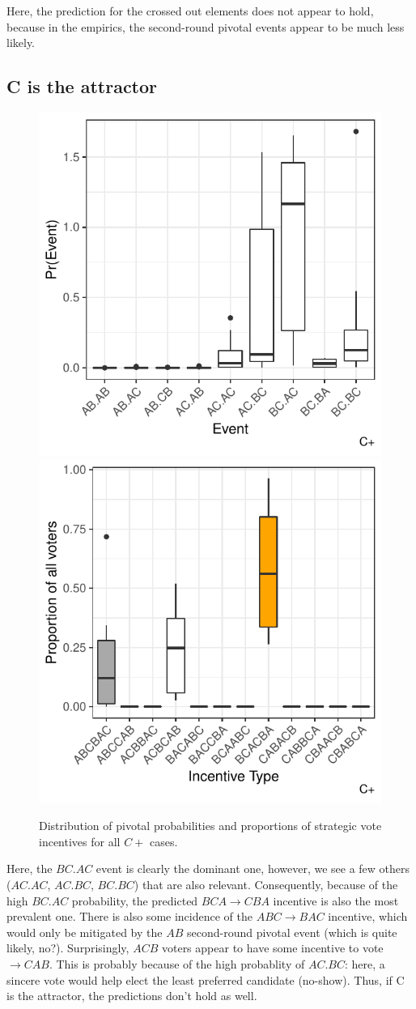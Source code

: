 \documentclass[11pt, letter, margin = 2 in]{article}
\begin{document}
Here, the prediction for the crossed out elements does not appear to hold, because in the empirics, the second-round pivotal events appear to be much less likely.

\subsection{C is the attractor}

\begin{figure}[!htb]
	\centering
	\includegraphics[width = .45\textwidth]{../output/figures/prediction/pprob_sp_c.pdf}
	\includegraphics[width = .45\textwidth]{../output/figures/prediction/svinc_sp_c.pdf}
	\caption{Distribution of pivotal probabilities and proportions of strategic vote incentives for all $C+$ cases.}
	\label{fig:figure1}
\end{figure}

Here, the $BC.AC$ event is clearly the dominant one, however, we see a few others ($AC.AC$, $AC.BC$, $BC.BC$) that are also relevant. Consequently, because of the high $BC.AC$ probability, the predicted $BCA \rightarrow CBA$ incentive is also the most prevalent one. There is also some incidence of the $ABC \rightarrow BAC$ incentive, which would only be mitigated by the $AB$ second-round pivotal event (which is quite likely, no?). Surprisingly, $ACB$ voters appear to have some incentive to vote $\rightarrow CAB$. This is probably because of the high probablity of $AC.BC$: here, a sincere vote would help elect the least preferred candidate (no-show). Thus, if C is the attractor, the predictions don't hold as well.
\end{document}
